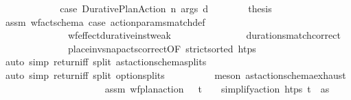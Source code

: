 \begin{isabellebody}
\ \ \ \ \isamarkupfalse%
\isanewline
\ \ \ \ \ \ \isamarkupfalse%
\ case{\isacharunderscore}{\kern0pt}{\isasympi}{\isacharcolon}{\kern0pt}\ {\isacharparenleft}{\kern0pt}Durative{\isacharunderscore}{\kern0pt}Plan{\isacharunderscore}{\kern0pt}Action\ n\ args\ d{\isacharparenright}{\kern0pt}\isanewline
\ \ \ \ \ \ \isamarkupfalse%
\ {\isacharquery}{\kern0pt}thesis\ \isanewline
\ \ \ \ \ \ \ \ \isamarkupfalse%
\ assm{}\ wf{\isacharunderscore}{\kern0pt}act{\isacharunderscore}{\kern0pt}schema{\isacharunderscore}{\kern0pt}{\isasympi}\ case{\isacharunderscore}{\kern0pt}{\isasympi}\ action{\isacharunderscore}{\kern0pt}params{\isacharunderscore}{\kern0pt}match{\isacharunderscore}{\kern0pt}def\ \isanewline
\ \ \ \ \ \ \ \ \ \ \ \ \ \ wf{\isacharunderscore}{\kern0pt}effect{\isacharunderscore}{\kern0pt}durative{\isacharunderscore}{\kern0pt}inst{\isacharunderscore}{\kern0pt}weak\ \isanewline
\ \ \ \ \ \ \ \ \ \ \ \ \ \ durations{\isacharunderscore}{\kern0pt}match{\isacharprime}{\kern0pt}{\isacharunderscore}{\kern0pt}correct\ \isanewline
\ \ \ \ \ \ \ \ \ \ \ \ \ \ place{\isacharunderscore}{\kern0pt}inv{\isacharunderscore}{\kern0pt}snap{\isacharunderscore}{\kern0pt}acts{\isacharunderscore}{\kern0pt}correct{\isacharbrackleft}{\kern0pt}OF\ {\isacartoucheopen}strict{\isacharunderscore}{\kern0pt}sorted\ htps{\isacartoucheclose}{\isacharbrackright}{\kern0pt}\isanewline
\ \ \ \ \ \ \ \ \isamarkupfalse%
\ {\isacharparenleft}{\kern0pt}auto\ simp{\isacharcolon}{\kern0pt}\ return{\isacharunderscore}{\kern0pt}iff\ split{\isacharcolon}{\kern0pt}\ ast{\isacharunderscore}{\kern0pt}action{\isacharunderscore}{\kern0pt}schema{\isachardot}{\kern0pt}splits{\isacharparenright}{\kern0pt}\isanewline
\ \ \ \ \ \ \ \ \isamarkupfalse%
\ {\isacharparenleft}{\kern0pt}auto\ simp{\isacharcolon}{\kern0pt}\ return{\isacharunderscore}{\kern0pt}iff\ split{\isacharcolon}{\kern0pt}\ option{\isachardot}{\kern0pt}splits{\isacharparenright}{\kern0pt}\isanewline
\ \ \ \ \ \ \ \ \isamarkupfalse%
\ {\isacharparenleft}{\kern0pt}meson\ ast{\isacharunderscore}{\kern0pt}action{\isacharunderscore}{\kern0pt}schema{\isachardot}{\kern0pt}exhaust{\isacharparenright}{\kern0pt}{\isacharplus}{\kern0pt}\isanewline
\ \ \ \ \ \ \ \ \isamarkupfalse%
\isanewline
\ \ \ \ \isamarkupfalse%
\isanewline
\ \ \isamarkupfalse%
\isanewline
\ \ \ \ \isamarkupfalse%
\ assm{}{\isacharcolon}{\kern0pt}\ {\isachardoublequoteopen}wf{\isacharunderscore}{\kern0pt}plan{\isacharunderscore}{\kern0pt}action\ {\isasympi}\ {\isasymand}\ t\isactrlsub {\isasympi}\ {\isasymge}\ {}\ {\isasymand}\ simplify{\isacharunderscore}{\kern0pt}action\ htps\ {\isacharparenleft}{\kern0pt}t\isactrlsub {\isasympi}{\isacharcomma}{\kern0pt}{\isasympi}{\isacharparenright}{\kern0pt}\ {\isacharequal}{\kern0pt}\ as{\isachardoublequoteclose}\isanewline

\end{isabellebody}
